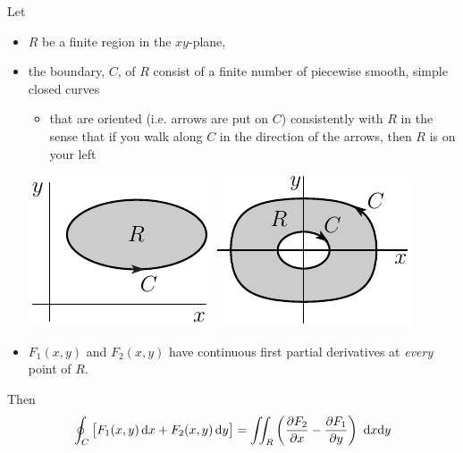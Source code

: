 \begin{theorem}\label{thm:Green}
Let 
\begin{itemize}\itemsep1pt \parskip0pt  %
\item
$R$ be a finite region in the $xy$-plane,
\item
the boundary, $C$, of $R$ consist of a finite number of piecewise smooth, simple closed curves 
    \begin{itemize}\itemsep1pt \parskip0pt  %
     \item
     that are oriented (i.e. arrows are put on $C$) consistently 
     with $R$ in the sense that if you walk along
     $C$ in the direction of the arrows, then $R$ is on your left
    \end{itemize}
     \begin{efig}
     \begin{center}
        \includegraphics{greens1.pdf}\qquad
        \includegraphics{dcircleE.pdf}
    \end{center}
    \end{efig}
\item
$F_1(x,y)$ and $F_2(x,y)$ have continuous first partial derivatives 
at \emph{every} point of $R$.
\end{itemize}
Then
\begin{equation*}
\oint_{C} \big[F_1(x,y)\,\dee{x} +F_2(x,y)\,\dee{y}\big]
 =\dblInt_{R}\left(\frac{\partial F_2}{\partial x} 
                - \frac{\partial F_1}{\partial y}\right)\ \dee{x}\dee{y}
\end{equation*}
\end{theorem}

